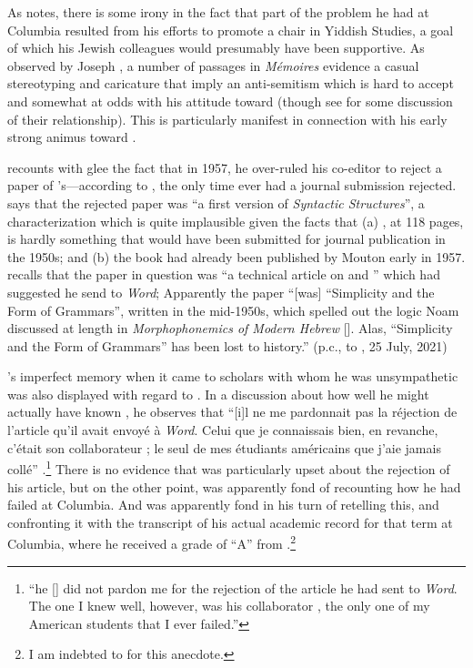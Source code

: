 As \citet{joseph94:rvw.martinet} notes, there is some irony in the
fact that part of the problem he had at Columbia resulted from his
efforts to promote a chair in Yiddish Studies, a goal of which his
Jewish colleagues would presumably have been supportive.  As observed
by Joseph \citep[and also by][]{auroux93:martinet,goldsmith98:rvw.barsky},
a number of passages in 
\textsl{Mémoires} evidence a casual stereotyping and caricature that
imply an anti-semitism which is hard to accept and somewhat at odds
with his attitude toward {\Weinreich} (though see
\citealt{joseph16:martinet.weinreich} for some discussion of their
relationship). This is particularly manifest in connection with his
early strong animus toward {\Chomsky}.

\citet[30f.]{martinet94:word} recounts with glee the fact that in
1957, he over-ruled his co-editor {\Weinreich} to reject a paper of
{\Chomsky}'s---according to \citet[347]{murray99:gatekeepers}, the only
time {\Chomsky} ever had a journal submission rejected. {\Martinet} says
that the rejected paper was ``a first version of \textsl{Syntactic
  Structures}'', a characterization which is quite implausible given
the facts that (a) \citealt{chomsky57:ss}, at 118 pages, is hardly
something that would have been submitted for journal publication in
the 1950s; and (b) the book had already been published by Mouton early
in 1957.  \citet[132]{chomsky79:lg.and.resp} recalls that the paper in
question was ``a technical article on  and ''
which {\Jakobson} had suggested he send to \textsl{Word}; Apparently the
paper ``[was] ``Simplicity and the Form of Grammars'', written in the
mid-1950s, which spelled out the logic Noam discussed at length in
\textsl{Morphophonemics of Modern Hebrew}
{[\citealt{chomsky51:mmh}]}. Alas, ``Simplicity and the Form of
Grammars'' has been lost to history.'' (p.c.,  
to , 25 July, 2021)

{\Martinet}'s imperfect memory when it came to scholars with whom he was
unsympathetic was also displayed with regard to . In a
discussion about how well he might actually have known {\Chomsky}, he
observes that ``[i]l ne me pardonnait pas la réjection de l'article
qu'il avait envoyé à \textsl{Word}. Celui que je connaissais bien, en
revanche, c'était son collaborateur ; le seul de mes
étudiants américains que j'aie jamais collé''
\citep[69]{martinet93:memoires}.\footnote{``he [{\Chomsky}] did not
  pardon me for the rejection of the article he had sent to
  \textsl{Word}. The one I knew well, however, was his collaborator
  , the only one of my American students that I ever
  failed.''} There is no evidence that {\Chomsky} was particularly upset
about the rejection of his article, but on the other point, {\Martinet}
was apparently fond of recounting how he had failed {\Halle} at
Columbia. And {\Halle} was apparently fond in his turn of retelling this,
and confronting it with the transcript of his actual academic record
for that term at Columbia, where he received a grade of ``A'' from
{\Martinet}.\footnote{I am indebted to  for this anecdote.}

